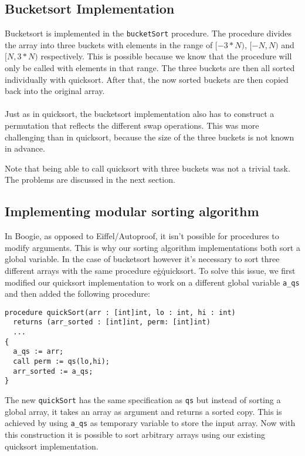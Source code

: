 \subsection{Bucketsort Implementation}

Bucketsort is implemented in the \texttt{bucketSort} procedure.  
The procedure divides the array into three buckets with elements in the range of $[-3*N)$, $[-N,N)$ and
$[N,3*N)$ respectively. This is possible because we know that the procedure will only be called with elements in that range.
The three buckets are then all sorted individually with quicksort. 
After that, the now sorted buckets are then copied back into the original array.
\\\\
Just as in quicksort, the bucketsort implementation also has to construct a permutation that reflects
the different swap operations. This was more challenging than in quicksort, because the size of the
three buckets is not known in advance. 


Note that being able to call quicksort with three buckets was not a trivial task. 
The problems are discussed in the next section. 

\subsection{Implementing modular sorting algorithm}

In Boogie, as opposed to Eiffel/Autoproof, it isn't possible for procedures to modify
arguments. This is why our sorting algorithm implementations both sort a global variable. 
In the case of bucketsort however it's necessary to sort three different arrays with the
same procedure e\.g\. quicksort. To solve this issue, we first modified our quicksort implementation
to work on a different global variable \texttt{a\_qs} and then added the following procedure:

\begin{verbatim}
procedure quickSort(arr : [int]int, lo : int, hi : int) 
  returns (arr_sorted : [int]int, perm: [int]int) 
  ...
{
  a_qs := arr;
  call perm := qs(lo,hi);
  arr_sorted := a_qs;
}
\end{verbatim}

The new \texttt{quickSort} has the same specification as \texttt{qs} but instead of sorting a global array,
it takes an array as argument and returns a sorted copy. This is achieved by using \texttt{a\_qs} as temporary 
variable to store the input array. Now with this construction it is possible to sort arbitrary arrays using
our existing quicksort implementation.



